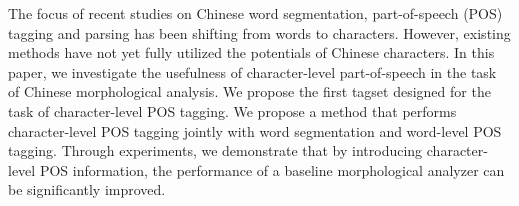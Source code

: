 The focus of recent studies on Chinese word segmentation, part-of-speech (POS) tagging and parsing has been shifting from words to characters. However, existing methods have not yet fully utilized the potentials of Chinese characters. In this paper, we investigate the usefulness of character-level part-of-speech in the task of Chinese morphological analysis. We propose the first tagset designed for the task of character-level POS tagging. We propose a method that performs character-level POS tagging jointly with word segmentation and word-level POS tagging. Through experiments, we demonstrate that by introducing character-level POS information, the performance of a baseline morphological analyzer can be significantly improved.
